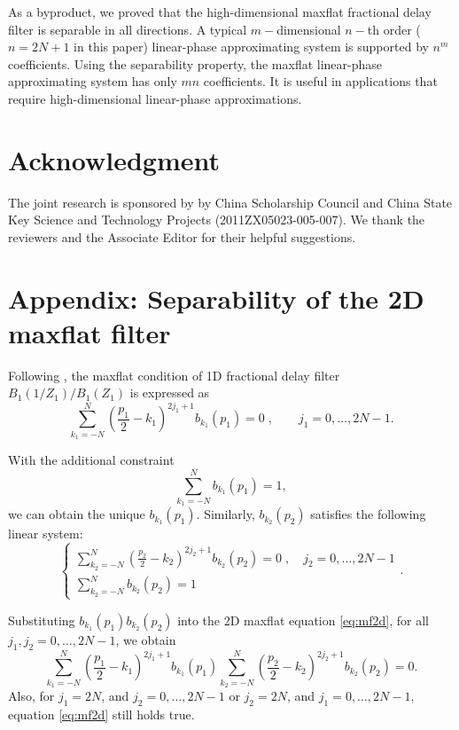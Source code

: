 As a byproduct, 
we proved that the high-dimensional maxflat fractional delay filter 
is separable in all directions.
A typical $m-$dimensional $n-$th order 
($n=2N+1$ in this paper) linear-phase 
approximating system is supported by $n^m$ coefficients.
Using the separability property,
the maxflat linear-phase
approximating system has only $mn$ coefficients.
It is useful in applications that require 
high-dimensional linear-phase approximations.

\section*{Acknowledgment}
The joint research is sponsored by by China Scholarship Council and
China State Key Science and Technology Projects (2011ZX05023-005-007).
We thank the reviewers and the Associate Editor for
their helpful suggestions.

\appendix
\section{Appendix: Separability of the 2D maxflat filter}
\label{apd:decouple}

Following \cite{thiran1971recursive}, 
the maxflat condition of 1D fractional delay
filter $B_1(1/Z_1)/B_1(Z_1)$ is expressed as
\begin{equation}
\sum_{k_1=-N}^N(\frac{p_1}{2}-k_1)^{2j_1+1}b_{k_1}(p_1)=0\;,
\qquad j_1=0,\dots,2N-1.
\end{equation}

With the additional constraint \cite[]{chen:2012a}
\begin{equation}
\sum_{k_1=-N}^Nb_{k_1}(p_1)=1,
\end{equation}
we can obtain the unique $b_{k_1}(p_1)$.
Similarly, $b_{k_2}(p_2)$ satisfies 
the following linear system:
\begin{equation}
\left\{\begin{array}{l}
\displaystyle{\sum_{k_2=-N}^N(\frac{p_2}{2}-k_2)^{2j_2+1}b_{k_2}(p_2)=0}\;,
 \quad j_2=0,\dots,2N-1 \\
\displaystyle{\sum_{k_2=-N}^Nb_{k_2}(p_2)=1}
\end{array}\right..
\end{equation}

Substituting $b_{k_1}(p_1)b_{k_2}(p_2)$ into 
the 2D maxflat equation \ref{eq:mf2d}, for all
$j_1,j_2=0,\dots,2N-1$, we obtain
\begin{equation}
\sum_{k_1=-N}^N(\frac{p_1}{2}-k_1)^{2j_1+1}b_{k_1}(p_1)
\sum_{k_2=-N}^N(\frac{p_2}{2}-k_2)^{2j_2+1}b_{k_2}(p_2)=0.
\end{equation}
Also, for
$j_1=2N$, and $j_2=0,\dots,2N-1$ 
or $j_2=2N$, and $j_1=0,\dots,2N-1$,
equation \ref{eq:mf2d} still holds true.

